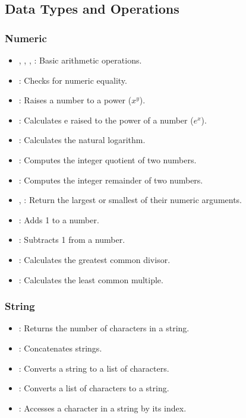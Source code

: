 \subsection{Data Types and Operations}

\subsubsection{Numeric}
\begin{itemize}
    \item \code{+}, \code{-}, \code{*}, \code{/}: Basic arithmetic operations.
    \item \code{=}: Checks for numeric equality.
    \item {}: Raises a number to a power ($x^y$).
    \item {}: Calculates e raised to the power of a number ($e^x$).
    \item {}: Calculates the natural logarithm.
    \item {}: Computes the integer quotient of two numbers.
    \item {}: Computes the integer remainder of two numbers.
    \item {}, : Return the largest or smallest of their numeric arguments.
    \item {}: Adds 1 to a number.
    \item {}: Subtracts 1 from a number.
    \item {}: Calculates the greatest common divisor.
    \item {}: Calculates the least common multiple.
\end{itemize}

\subsubsection{String}
\begin{itemize}
    \item {}: Returns the number of characters in a string.
    \item {}: Concatenates strings.
    \item {}: Converts a string to a list of characters.
    \item {}: Converts a list of characters to a string.
    \item {}: Accesses a character in a string by its index.
\end{itemize}

